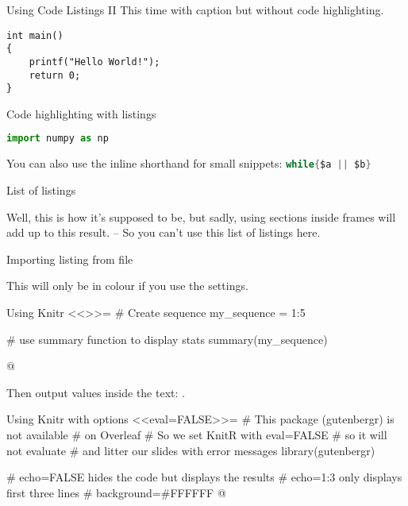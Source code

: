 
\begin{frame}[fragile]{Using Code Listings II}
This time with caption but without code highlighting.
\begin{lstlisting}[caption={Hello World! in C}]
int main()
{
    printf("Hello World!");
    return 0;
}
\end{lstlisting}
\end{frame}

\begin{frame}[fragile]{Code highlighting with listings}
\begin{lstlisting}[language=Python, caption={A demonstration}]
import numpy as np
\end{lstlisting}

You can also use the inline shorthand for small snippets: \lstinline[language=C]!while{$a || $b}!

\end{frame}

\begin{frame}{List of listings}
    
    Well, this is how it's supposed to be, but sadly, using sections inside frames will add up to this result. -- So you can't use this list of listings here.
\end{frame}



\begin{frame}[fragile]{Importing listing from file}
\lstset{style=myxml} %


This will only be in colour if you use the settings.
\end{frame}

\begin{frame}[fragile]{Using Knitr}
<<>>=
# Create sequence
my_sequence = 1:5
 
# use summary function to display stats
summary(my_sequence)
 
@

Then output values inside the text: .
\end{frame}

\begin{frame}[fragile]{Using Knitr with options}
<<eval=FALSE>>=
# This package (gutenbergr) is not available 
# on Overleaf
# So we set KnitR with eval=FALSE
# so it will not evaluate
# and litter our slides with error messages
library(gutenbergr)

# echo=FALSE hides the code but displays the results
# echo=1:3 only displays first three lines
# background=#FFFFFF
@

\end{frame}


